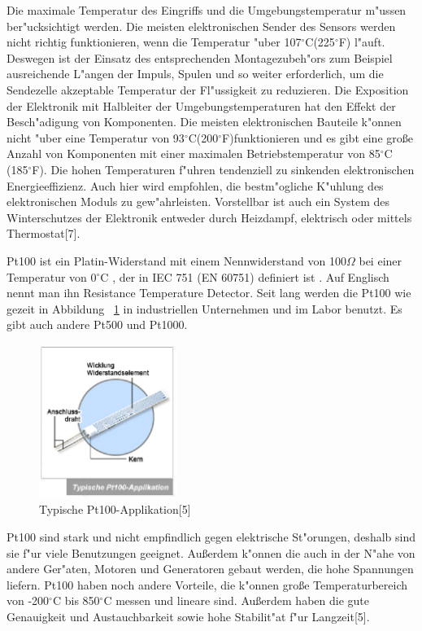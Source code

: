 Die maximale Temperatur des Eingriffs und 
die Umgebungstemperatur m"ussen   ber"ucksichtigt werden. 
Die meisten elektronischen Sender des Sensors werden  
nicht richtig funktionieren, 
wenn die Temperatur "uber  107$^\circ$C(225$^\circ$F) l"auft. 
Deswegen ist der Einsatz des entsprechenden Montagezubeh"ors
 zum Beispiel ausreichende L"angen der Impuls, 
 Spulen und so weiter  erforderlich, 
 um  die Sendezelle akzeptable Temperatur der Fl"ussigkeit zu 
 reduzieren. 
 Die Exposition der Elektronik mit Halbleiter der 
 Umgebungstemperaturen hat den Effekt der 
 Besch"adigung von Komponenten. 
 Die meisten elektronischen Bauteile
  k"onnen  nicht  "uber eine Temperatur  
 von 93$^\circ$C(200$^\circ$F)funktionieren  und es gibt eine große Anzahl 
 von Komponenten mit einer maximalen Betriebstemperatur 
 von 85$^\circ$C (185$^\circ$F). 
 Die hohen Temperaturen f"uhren tendenziell
 zu sinkenden elektronischen Energieeffizienz. 
 Auch hier wird empfohlen, 
 die bestm"ogliche K"uhlung des elektronischen Moduls zu gew"ahrleisten.
 Vorstellbar ist auch ein System des Winterschutzes 
 der Elektronik entweder  
 durch Heizdampf, elektrisch oder mittels Thermostat[7].
 
Pt100 ist ein Platin-Widerstand mit einem Nennwiderstand 
von 100$\Omega$ bei einer Temperatur von 0$^\circ$C ,
der in IEC 751 (EN 60751) definiert ist .
Auf Englisch nennt man ihn Resistance Temperature Detector. 
Seit lang werden die Pt100 wie gezeit in Abbildung ~\ref{fig:pt100} in industriellen Unternehmen und 
im Labor benutzt. 
Es gibt auch  andere Pt500 und Pt1000.

\begin{figure}[!htb]
\begin{center}
\includegraphics[height=5cm]{bilder/pt100.eps}
\end{center}
\caption{Typische Pt100-Applikation[5]}\label{fig:pt100}
\end{figure}
 
 Pt100 sind stark und nicht empfindlich gegen elektrische St"orungen,
 deshalb sind sie f"ur viele Benutzungen geeignet.
 Außerdem k"onnen die auch in der N"ahe von andere Ger"aten, 
 Motoren und Generatoren gebaut werden, die hohe Spannungen liefern.
 Pt100 haben noch andere Vorteile, die k"onnen große 
 Temperaturbereich von -200$^\circ$C bis 850$^\circ$C messen und lineare sind.
 Außerdem haben die gute Genauigkeit und Austauchbarkeit  
 sowie hohe Stabilit"at f"ur Langzeit[5]. 
 
